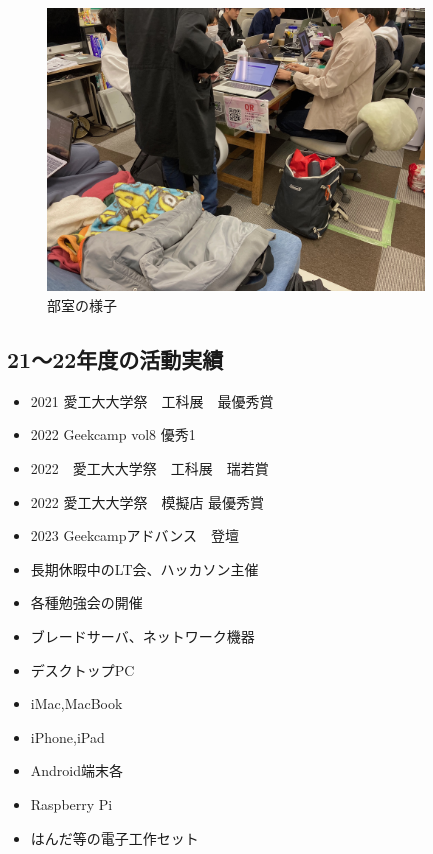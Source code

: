 \begin{figure}[bht]
  \centering
  \includegraphics[width=10cm]{./image/02-AboutSysken/room.jpg}
  \caption{部室の様子}
\end{figure}

\subsection{21〜22年度の活動実績}
\begin{itemize}
  \item 2021 愛工大大学祭　工科展　最優秀賞
  \item 2022 Geekcamp vol8 優秀1
  \item 2022　愛工大大学祭　工科展　瑞若賞
  \item 2022 愛工大大学祭　模擬店 最優秀賞
  \item 2023 Geekcampアドバンス　登壇
  \item 長期休暇中のLT会、ハッカソン主催
  \item 各種勉強会の開催
\end{itemize}

\begin{tcolorbox}[title=シス研の設備]
  \begin{itemize}
    \item ブレードサーバ、ネットワーク機器
    \item デスクトップPC
    \item iMac,MacBook
    \item iPhone,iPad
    \item Android端末各
    \item Raspberry Pi
    \item はんだ等の電子工作セット
  \end{itemize} 
\end{tcolorbox}

